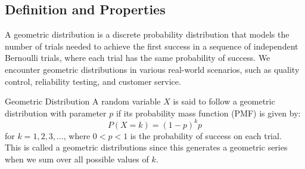 \documentclass[openany]{book}
\begin{document}
\subsection{Definition and Properties}
A geometric distribution is a discrete probability distribution that models the number of trials needed to achieve the first success in a sequence of independent Bernoulli trials, where each trial has the same probability of success. We encounter geometric distributions in various real-world scenarios, such as quality control, reliability testing, and customer service.
\begin{mydefinition}{Geometric Distribution}
    A random variable $X$ is said to follow a geometric distribution with parameter $p$ if its probability mass function (PMF) is given by:
    $$P(X = k) = (1 - p)^{k} p$$
    for $k = 1, 2, 3, \ldots$, where $0 < p < 1$ is the probability of success on each trial. \\ 
    This is called a geometric distributions since this generates a geometric series when we sum over all possible values of $k$.
\end{mydefinition}
\end{document}
